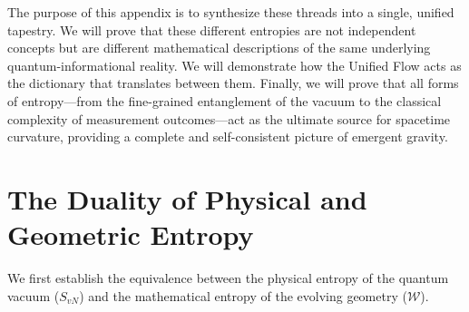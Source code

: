 \documentclass[11pt, letterpaper]{report}
\theoremstyle{plain} %
\theoremstyle{definition} %
\theoremstyle{remark} %
\begin{document}
The purpose of this appendix is to synthesize these threads into a single, unified tapestry. We will prove that these different entropies are not independent concepts but are different mathematical descriptions of the same underlying quantum-informational reality. We will demonstrate how the Unified Flow acts as the dictionary that translates between them. Finally, we will prove that all forms of entropy—from the fine-grained entanglement of the vacuum to the classical complexity of measurement outcomes—act as the ultimate source for spacetime curvature, providing a complete and self-consistent picture of emergent gravity.

\section{The Duality of Physical and Geometric Entropy}
\label{app:svn_perelman_duality}

We first establish the equivalence between the physical entropy of the quantum vacuum ($S_{vN}$) and the mathematical entropy of the evolving geometry ($\mathcal{W}$).
\end{document}

